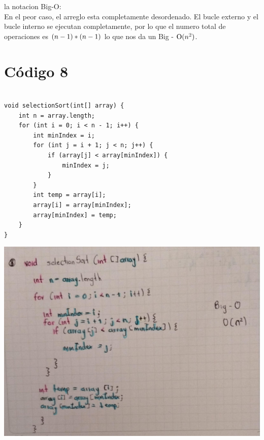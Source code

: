 \documentclass[a4paper,onecolumn,10pt]{article}
\begin{document}
la notacion Big-O: \\

En el peor caso, el arreglo esta completamente desordenado. El bucle externo y el bucle interno se ejecutan completamente, por lo que el numero total de operaciones es $\text(n - 1) * (n - 1)$ lo que nos da un Big - $\text O(n^2)$.
\\

\section{Código 8}

\begin{verbatim}

void selectionSort(int[] array) {
    int n = array.length;
    for (int i = 0; i < n - 1; i++) {
        int minIndex = i;
        for (int j = i + 1; j < n; j++) {
            if (array[j] < array[minIndex]) {
                minIndex = j;
            }
        }
        int temp = array[i];
        array[i] = array[minIndex];
        array[minIndex] = temp;
    }
}

\end{verbatim}

\includegraphics[width=0.95\linewidth]{imagenes/punto 8.jpeg}
\end{document}
